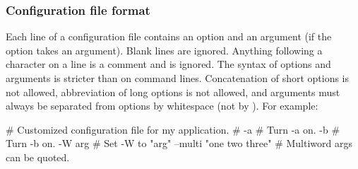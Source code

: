   \subsubsection{Configuration file format}

Each line of a configuration file contains an option and an argument
(if the option takes an argument). Blank lines are ignored.  Anything
following a \ccode{\#} character on a line is a comment and is
ignored. The syntax of options and arguments is stricter than on
command lines.  Concatenation of short options is not allowed,
abbreviation of long options is not allowed, and arguments must always
be separated from options by whitespace (not by \ccode{=}). For
example:

\begin{cchunk}
   # Customized configuration file for my application.
   #
   -a                        # Turn -a on.
   -b                        # Turn -b on.
   -W      arg               # Set -W to "arg"
   --multi "one two three"   # Multiword args can be quoted.
\end{cchunk}
